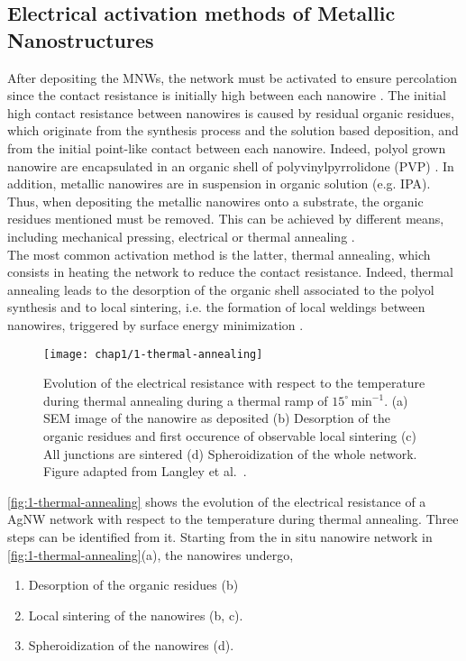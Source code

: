 \subsection{Electrical activation methods of Metallic Nanostructures}
    After depositing the MNWs, the network must be activated to ensure percolation since the contact resistance is initially high between each nanowire \cite{Nguyen2022}. The initial high contact resistance between nanowires is caused by residual organic residues, which originate from the synthesis process and the solution based deposition, and from the initial point-like contact between each nanowire. Indeed, polyol grown nanowire are encapsulated in an organic shell of polyvinylpyrrolidone (PVP) \cite{Sun2003,Nguyen2022}. In addition, metallic nanowires are in suspension in organic solution (e.g. IPA). Thus, when depositing the metallic nanowires onto a substrate, the organic residues mentioned must be removed. This can be achieved by different means, including mechanical pressing, electrical or thermal annealing \cite{JiuSuganuma2016}.\\
    The most common activation method is the latter, thermal annealing, which consists in heating the network to reduce the contact resistance. Indeed, thermal annealing leads to the desorption of the organic shell associated to the polyol synthesis and to local sintering, i.e. the formation of local weldings between nanowires, triggered by surface energy minimization \cite{Langley2014}.
    \begin{figure}[H]
        \centering
        \texttt{[image: chap1/1-thermal-annealing]}
        \caption{Evolution of the electrical resistance with respect to the temperature during thermal annealing during a thermal ramp of $15^\circ\,\text{min}^{-1}$. (a) SEM image of the nanowire as deposited (b) Desorption of the organic residues and first occurence of observable local sintering (c) All junctions are sintered (d) Spheroidization of the whole network. Figure adapted from Langley et al.\ \cite{Langley2014}.}
        \label{fig:1-thermal-annealing}
    \end{figure}
    \autoref{fig:1-thermal-annealing} shows the evolution of the electrical resistance of a AgNW network with respect to the temperature during thermal annealing. Three steps can be identified from it. Starting from the in situ nanowire network in \autoref{fig:1-thermal-annealing}(a), the nanowires undergo,
    \begin{enumerate}
        \item Desorption of the organic residues (b)
        \item Local sintering of the nanowires (b, c).
        \item Spheroidization of the nanowires (d).
    \end{enumerate}
